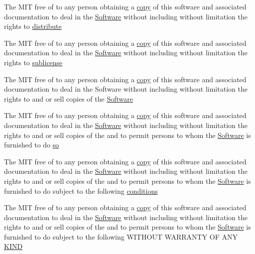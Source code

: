\begin{DoxyCompactItemize}
\item 
The M\+IT free of to any person obtaining a \hyperlink{LICENSE_8txt_aff1d4c6b756ebf691fa44a0904f68658}{copy} of this software and associated documentation to deal in the \hyperlink{LICENSE_8txt_a22a1529885b3e9d66b0c72fe604fc3dc}{Software} without including without limitation the rights to \hyperlink{LICENSE_8txt_ad8444ae07f9fa7b3e3e0cf4dc4551114}{distribute}
\item 
The M\+IT free of to any person obtaining a \hyperlink{LICENSE_8txt_aff1d4c6b756ebf691fa44a0904f68658}{copy} of this software and associated documentation to deal in the \hyperlink{LICENSE_8txt_a22a1529885b3e9d66b0c72fe604fc3dc}{Software} without including without limitation the rights to \hyperlink{LICENSE_8txt_af9fad5470a0b4e968d19b11b7c643fdb}{sublicense}
\item 
The M\+IT free of to any person obtaining a \hyperlink{LICENSE_8txt_aff1d4c6b756ebf691fa44a0904f68658}{copy} of this software and associated documentation to deal in the Software without including without limitation the rights to and or sell copies of the \hyperlink{LICENSE_8txt_a22a1529885b3e9d66b0c72fe604fc3dc}{Software}
\item 
The M\+IT free of to any person obtaining a \hyperlink{LICENSE_8txt_aff1d4c6b756ebf691fa44a0904f68658}{copy} of this software and associated documentation to deal in the \hyperlink{LICENSE_8txt_a22a1529885b3e9d66b0c72fe604fc3dc}{Software} without including without limitation the rights to and or sell copies of the and to permit persons to whom the \hyperlink{LICENSE_8txt_a22a1529885b3e9d66b0c72fe604fc3dc}{Software} is furnished to do \hyperlink{LICENSE_8txt_ab05c0f0392781fce452b91e1ede41d90}{so}
\item 
The M\+IT free of to any person obtaining a \hyperlink{LICENSE_8txt_aff1d4c6b756ebf691fa44a0904f68658}{copy} of this software and associated documentation to deal in the \hyperlink{LICENSE_8txt_a22a1529885b3e9d66b0c72fe604fc3dc}{Software} without including without limitation the rights to and or sell copies of the and to permit persons to whom the \hyperlink{LICENSE_8txt_a22a1529885b3e9d66b0c72fe604fc3dc}{Software} is furnished to do subject to the following \hyperlink{LICENSE_8txt_a9519688b6bdbbccdcec5fef05966b25b}{conditions}
\item 
The M\+IT free of to any person obtaining a \hyperlink{LICENSE_8txt_aff1d4c6b756ebf691fa44a0904f68658}{copy} of this software and associated documentation to deal in the \hyperlink{LICENSE_8txt_a22a1529885b3e9d66b0c72fe604fc3dc}{Software} without including without limitation the rights to and or sell copies of the and to permit persons to whom the \hyperlink{LICENSE_8txt_a22a1529885b3e9d66b0c72fe604fc3dc}{Software} is furnished to do subject to the following W\+I\+T\+H\+O\+UT W\+A\+R\+R\+A\+N\+TY OF A\+NY \hyperlink{LICENSE_8txt_a8e1a82be600178fe97c0e1339897c260}{K\+I\+ND}

\end{DoxyCompactItemize}
